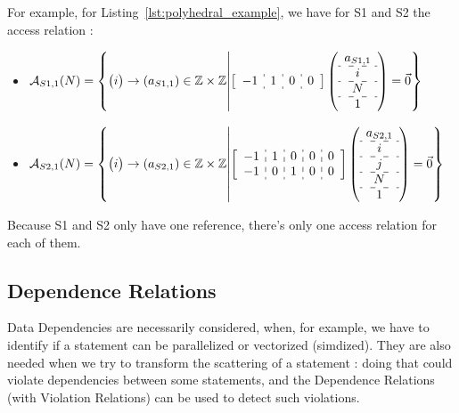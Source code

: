 \documentclass[paper=a4, fontsize=11.5pt]{scrartcl}
\numberwithin{equation}{section}        %
\numberwithin{figure}{section}          %
\numberwithin{table}{section}               %
\begin{document}
        For example, for Listing~\ref{lst:polyhedral_example}, we have for S1 and S2 the
        access relation :
        \begin{itemize}
            \item[]
                $
                \mathcal{A}_{S1,1}(N) = 
                \left\{
                \begin{pmatrix}i\end{pmatrix} \to \left(a_{S1,1}\right) \in \mathbb{Z}\times\mathbb{Z}
                    \middle|
                    \left[\begin{array}{c:c:c:c}-1 & 1 & 0 & 0 \end{array}\right]
                    \left(\begin{array}{c}a_{S1,1}\\\hdashline i\\\hdashline N\\\hdashline 1\end{array}\right)
                    = \vec{0}
                \right\}
                $
            
            \item[]
                $
                \mathcal{A}_{S2,1}(N) = 
                \left\{
                \begin{pmatrix}i\end{pmatrix} \to \left(a_{S2,1}\right) \in \mathbb{Z}\times\mathbb{Z}
                    \middle|
                    \left[\begin{array}{c:c:c:c:c}-1 & 1 & 0 & 0 & 0 \\
                                                  -1 & 0 & 1 & 0 & 0 \end{array}\right]
                    \left(\begin{array}{c}a_{S2,1}\\\hdashline i\\\hdashline j\\\hdashline N\\\hdashline 1\end{array}\right)
                    = \vec{0}
                \right\}
                $
        \end{itemize}

        Because S1 and S2 only have one reference, there's only one access relation for
        each of them.

    \subsection{Dependence Relations}
    \label{sec:dependence_relations}
        Data Dependencies are necessarily considered, when, for example, we have to identify if a statement
        can be parallelized or vectorized (simdized). They are also needed when we try to
        transform the scattering of a statement : doing that could violate dependencies between
        some statements, and the Dependence Relations (with Violation Relations) can be used to detect such
        violations.
\end{document}
